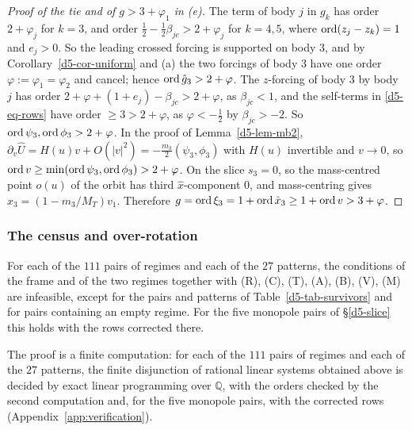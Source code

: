 \begin{proof}[Proof of the tie and of $g>3+\varphi_1$ in (e)]
The term of body $j$ in $g_k$ has order $2+\varphi_j$ for $k=3$, and order
$\frac12-\frac12\beta_{jc}>2+\varphi_j$ for $k=4,5$, where $\operatorname{ord}(z_j-z_k)=1$ and $e_j>0$.  So the
leading crossed forcing is supported on body $3$, and by Corollary~\ref{d5-cor-uniform} and (a)
the two forcings of body $3$ have one order $\varphi:=\varphi_1=\varphi_2$ and cancel; hence
$\operatorname{ord}\hat g_3>2+\varphi$.  The $z$-forcing of body $3$ by body $j$ has order
$2+\varphi+(1+e_j)-\beta_{jc}>2+\varphi$, as $\beta_{jc}<1$, and the self-terms in
\eqref{d5-eq-rows} have order $\ge3>2+\varphi$, as $\varphi<-\frac12$ by $\beta_{jc}>-2$.  So
$\operatorname{ord}\psi_3,\operatorname{ord}\phi_3>2+\varphi$.  In the proof of Lemma~\ref{d5-lem-mb2},
$\partial_v\hat U=H(u)v+O(|v|^2)=-\frac{m_3}2(\psi_3,\phi_3)$ with $H(u)$ invertible and $v\to0$,
so $\operatorname{ord} v\ge\min(\operatorname{ord}\psi_3,\operatorname{ord}\phi_3)>2+\varphi$.  On the slice $s_3=0$, so the mass-centred
point $o(u)$ of the orbit has third $\hat x$-component $0$, and mass-centring gives
$\hat x_3=(1-m_3/M_T)v_1$.  Therefore $g=\operatorname{ord}\xi_3=1+\operatorname{ord}\hat x_3\ge1+\operatorname{ord} v>3+\varphi$.
\end{proof}

\subsubsection{The census and over-rotation}\label{d5-result}

\begin{lemma}\label{d5-lem-census}
For each of the $111$ pairs of regimes and each of the $27$ patterns, the conditions of the frame
and of the two regimes together with (R), (C), (T), (A), (B), (V), (M) are infeasible, except for
the pairs and patterns of Table~\ref{d5-tab-survivors} and for pairs containing an empty regime.
For the five monopole pairs of \S\ref{d5-slice} this holds with the rows corrected there.
\end{lemma}
The proof is a finite computation: for each of the $111$ pairs of regimes and each of the $27$
patterns, the finite disjunction of rational linear systems obtained above is decided by exact
linear programming over $\mathbb Q$, with the orders checked by the second computation and, for
the five monopole pairs, with the corrected rows (Appendix~\ref{app:verification}).

